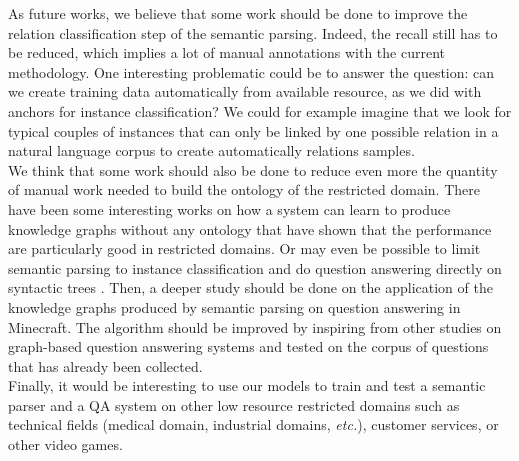 \documentclass[12pt]{article}
\begin{document}
As future works, we believe that some work should be done to improve the relation classification step of the semantic parsing. Indeed, the recall still has to be reduced, which implies a lot of manual annotations with the current methodology. One interesting problematic could be to answer the question: can we create training data automatically from available resource, as we did with anchors for instance classification? We could for example imagine that we look for typical couples of instances that can only be linked by one possible relation in a natural language corpus to create automatically relations samples.\\
We think that some work should also be done to reduce even more the quantity of manual work needed to build the ontology of the restricted domain. There have been some interesting works on how a system can learn to produce knowledge graphs without any ontology \cite{hixon2015learning} that have shown that the performance are particularly good in restricted domains. Or may even be possible to limit semantic parsing to instance classification and do question answering directly on syntactic trees \cite{gomez2014graph}.
Then, a deeper study should be done on the application of the knowledge graphs produced by semantic parsing on question answering in Minecraft. The algorithm should be improved by inspiring from other studies on graph-based question answering systems \cite{molla2005learning,molla2006learning} and tested on the corpus of questions that has already been collected.\\
Finally, it would be interesting to use our models to train and test a semantic parser and a QA system on other low resource restricted domains \cite{molla2007question} such as technical fields (medical domain, industrial domains, \emph{etc.}), customer services, or other video games.
\end{document}

